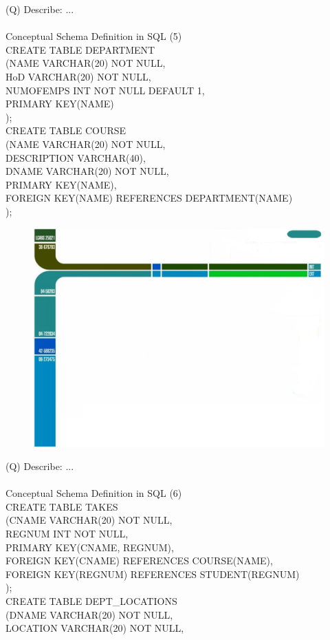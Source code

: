 \documentclass[12pt]{article}
\begin{document}
\clearpage
(Q)
Describe: ...
\\ 
 \\
Conceptual Schema Definition in SQL (5)\\
CREATE TABLE DEPARTMENT\\
(NAME VARCHAR(20) NOT NULL,\\
HoD VARCHAR(20) NOT NULL,\\
NUMOFEMPS INT NOT NULL DEFAULT 1,\\
PRIMARY KEY(NAME)\\
);\\
CREATE TABLE COURSE\\
(NAME VARCHAR(20) NOT NULL,\\
DESCRIPTION VARCHAR(40),\\
DNAME VARCHAR(20) NOT NULL,\\
PRIMARY KEY(NAME),\\
FOREIGN KEY(NAME) REFERENCES DEPARTMENT(NAME)\\
);\\
\begin{figure}[H]
\includegraphics[width=0.5\linewidth]{page9-image-1.png}
\end{figure}
\clearpage
(Q)
Describe: ...
\\ 
 \\
Conceptual Schema Definition in SQL (6)\\
CREATE TABLE TAKES\\
(CNAME VARCHAR(20) NOT NULL,\\
REGNUM INT NOT NULL,\\
PRIMARY KEY(CNAME, REGNUM),\\
FOREIGN KEY(CNAME)    REFERENCES COURSE(NAME),\\
FOREIGN KEY(REGNUM) REFERENCES STUDENT(REGNUM)\\
);\\
CREATE TABLE DEPT\_LOCATIONS\\
(DNAME VARCHAR(20) NOT NULL,\\
LOCATION VARCHAR(20) NOT NULL,\\
\end{document}
